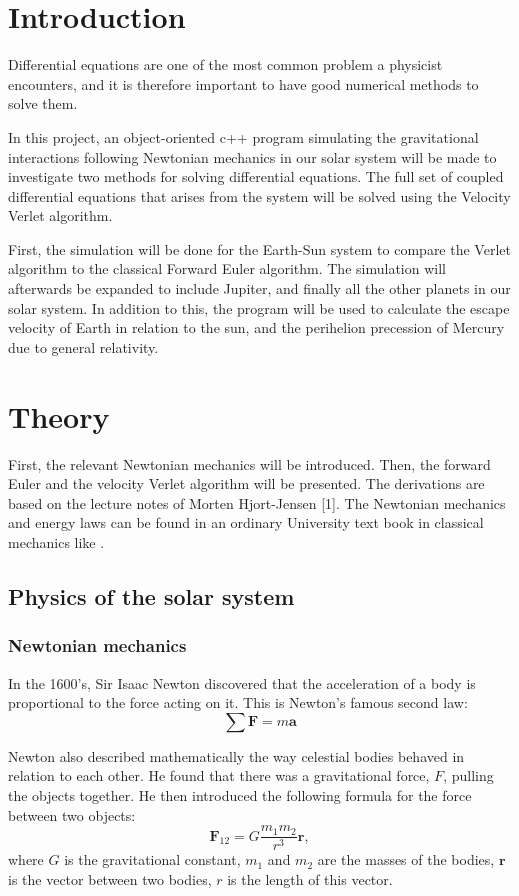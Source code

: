 \documentclass[10pt,a4paper,titlepage]{article}
\begin{document}
\section{Introduction}
Differential equations are one of the most common problem a physicist encounters, and it is therefore important to have good numerical methods to solve them. 
	
In this project, an object-oriented c++ program simulating the gravitational interactions following Newtonian mechanics in our solar system will be made to investigate two methods for solving differential equations. The full set of coupled differential equations that arises from the system will be solved using the Velocity Verlet algorithm. 

First, the simulation will be done for the Earth-Sun system to compare the Verlet algorithm to the classical Forward Euler algorithm. The simulation will afterwards be expanded to include Jupiter, and finally all the other planets in our solar system. In addition to this, the program will be used to calculate the escape velocity of Earth in relation to the sun, and the perihelion precession of Mercury due to general relativity. 


\section{Theory}
First, the relevant Newtonian mechanics will be introduced. Then, the forward Euler and the velocity Verlet algorithm will be presented. The derivations are based on the lecture notes of Morten Hjort-Jensen [1]. The Newtonian mechanics and energy laws can be found in an ordinary University text book in classical mechanics like \cite{physics}. 
\subsection{Physics of the solar system} 
\subsubsection{Newtonian mechanics}
In the 1600's, Sir Isaac Newton discovered that the acceleration of a body is proportional to the force acting on it. This is Newton's famous second law:
\begin{equation}
\label{eq:newt_2}
\sum\mathbf{F} = m\mathbf{a}
\end{equation}


Newton also described mathematically the way celestial bodies behaved in relation to each other. He found that there was a gravitational force, $F$, pulling the objects together. He then introduced the following formula for the force between two objects:
\begin{equation}
\mathbf{F}_{12}=G\frac{m_{1}m_{2}}{r^3}\mathbf{r},
\end{equation}
where $G$ is the gravitational constant, $m_1$ and $m_2$ are the masses of the bodies, $\mathbf{r}$ is the vector between two bodies, $r$ is the length of this vector. 
\end{document}
